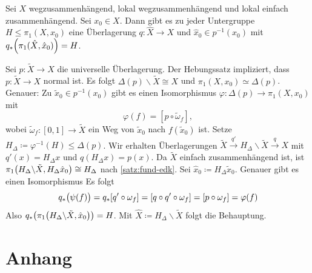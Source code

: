 \begin{satz}[{name={Existenz}}]
	Sei $X$ wegzusammenhängend, lokal wegzusammenhängend und lokal einfach zusammenhängend. Sei $x_0 \in X$. 
	Dann gibt es zu jeder Untergruppe $H \le \pi_1(X,x_0)$ eine Überlagerung $q \colon \hat{X} \to X$ und $\hat{x}_0 \in p^{-1} (x_0)$ mit $q_* \enbrace*{\pi_1(\hat{X}, \hat{x}_0)} = H$.
\end{satz}
\begin{beweis}
	Sei $p \colon \tilde{X} \to X$ die universelle Überlagerung. 
	Der Hebungssatz impliziert, dass $p \colon \tilde{X} \to X$ normal ist. 
	Es folgt $\Delta(p) \backslash \tilde{X} \cong X$ und $\pi_1(X, x_0) \simeq \Delta(p)$. 
	Genauer: Zu $\tilde{x}_0 \in p ^{-1}(x_0)$ gibt es einen Isomorphismus $\varphi \colon \Delta (p) \to \pi_1(X,x_0)$ mit 
	\[
		\varphi(f) = [p \circ \tilde{\omega}_f],
	\]
	wobei $\tilde{\omega}_f \colon [0,1] \to \tilde{X}$ ein Weg von $\tilde{x}_0$ nach $f (\tilde{x}_0)$ ist. 
	Setze $H_\Delta \coloneqq \varphi ^{-1}(H)  \le \Delta(p)$. 
	Wir erhalten Überlagerungen $\tilde{X} \xrightarrow{q'} H_\Delta \backslash \tilde{X} \xrightarrow{q} X $ mit $q'(x) = H_\Delta x$ und $q (H_\Delta x) = p(x)$. 
	Da $\tilde{X}$ einfach zusammenhängend ist, ist $\pi_1 \enbrace*{ H_\Delta \backslash \tilde{X}, H_\Delta \hat{x}_0} \cong H_\Delta$ nach \cref{satz:fund-edk}. 
	Sei $\hat{x}_0 \coloneqq H_\Delta \tilde{x}_0$.
	Genauer gibt es einen Isomorphismus
	Es folgt 
	\[
		q_* \enbrace[\big]{\psi(f)} = q_* \benbrace*{q' \circ \omega_f} = \benbrace*{q \circ q' \circ \omega_f} = \benbrace*{p \circ \omega_f} = \varphi(f) 
	\]
	Also $q_* \enbrace*{\pi_1 \enbrace*{H_\Delta \backslash \tilde{X}, \hat{x}_0}} = H $. 
	Mit $\hat{X} \coloneqq H_\Delta \backslash \tilde{X}$ folgt die Behauptung.
\end{beweis}

\cleardoubleoddemptypage
{}
\setcounter{page}{1}
\cleardoubleoddemptypage
\appendix

\section{Anhang} %
\label{sec:anhang}

\printindex
\printbibliography
\listoffigures

